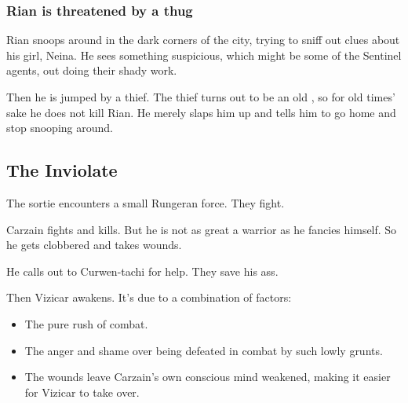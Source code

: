 \subsubsection{Rian is threatened by a thug}
Rian snoops around in the dark corners of the city, trying to sniff out clues about his girl, Neina. 
He sees something suspicious, 
which might be some of the Sentinel agents, out doing their shady work. 

Then he is jumped by a thief. The thief turns out to be an old , so for old times' sake he does not kill Rian. He merely slaps him up and tells him to go home and stop snooping around. 









\subsection{The \Caliph Inviolate}
The sortie encounters a small Rungeran force. They fight. 

Carzain fights and kills. 
But he is not as great a warrior as he fancies himself. 
So he gets clobbered and takes wounds. 

He calls out to Curwen-tachi for help. 
They save his ass. 

Then Vizicar awakens. 
It's due to a combination of factors: 

\begin{itemize}
  \item The pure rush of combat. 
  \item The anger and shame over being defeated in combat by such lowly grunts. 
  \item The wounds leave Carzain's own conscious mind weakened, making it easier for Vizicar to take over. 
\end{itemize}





